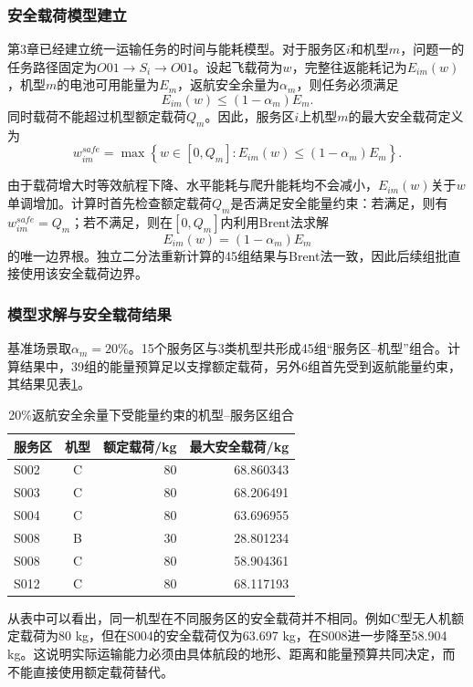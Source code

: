 \documentclass[UTF8,a4paper,12pt]{ctexart}
\begin{document}
\subsubsection{安全载荷模型建立}

第3章已经建立统一运输任务的时间与能耗模型。对于服务区$i$和机型$m$，问题一的任务路径固定为$O01\rightarrow S_i\rightarrow O01$。设起飞载荷为$w$，完整往返能耗记为$E_{im}(w)$，机型$m$的电池可用能量为$E_m$，返航安全余量为$\alpha_m$，则任务必须满足
\[
E_{im}(w)\le (1-\alpha_m)E_m.
\]
同时载荷不能超过机型额定载荷$Q_m$。因此，服务区$i$上机型$m$的最大安全载荷定义为
\[
\boxed{
w_{im}^{safe}
=
\max\left\{
w\in[0,Q_m]:
E_{im}(w)\le(1-\alpha_m)E_m
\right\}.
}
\]

由于载荷增大时等效航程下降、水平能耗与爬升能耗均不会减小，$E_{im}(w)$关于$w$单调增加。计算时首先检查额定载荷$Q_m$是否满足安全能量约束：若满足，则有$w_{im}^{safe}=Q_m$；若不满足，则在$[0,Q_m]$内利用Brent法求解
\[
E_{im}(w)=(1-\alpha_m)E_m
\]
的唯一边界根。独立二分法重新计算的45组结果与Brent法一致，因此后续组批直接使用该安全载荷边界。

\subsubsection{模型求解与安全载荷结果}

基准场景取$\alpha_m=20\%$。15个服务区与3类机型共形成45组“服务区--机型”组合。计算结果中，39组的能量预算足以支撑额定载荷，另外6组首先受到返航能量约束，其结果见表\ref{tab:q1_limited_payload}。

\begin{table}[H]
\centering
\caption{20\%返航安全余量下受能量约束的机型--服务区组合}
\label{tab:q1_limited_payload}
\begin{tabular}{lcrr}
\toprule
服务区 & 机型 & 额定载荷/kg & 最大安全载荷/kg\\
\midrule
S002 & C & 80 & 68.860343\\
S003 & C & 80 & 68.206491\\
S004 & C & 80 & 63.696955\\
S008 & B & 30 & 28.801234\\
S008 & C & 80 & 58.904361\\
S012 & C & 80 & 68.117193\\
\bottomrule
\end{tabular}
\end{table}

从表中可以看出，同一机型在不同服务区的安全载荷并不相同。例如C型无人机额定载荷为80 kg，但在S004的安全载荷仅为63.697 kg，在S008进一步降至58.904 kg。这说明实际运输能力必须由具体航段的地形、距离和能量预算共同决定，而不能直接使用额定载荷替代。
\end{document}

